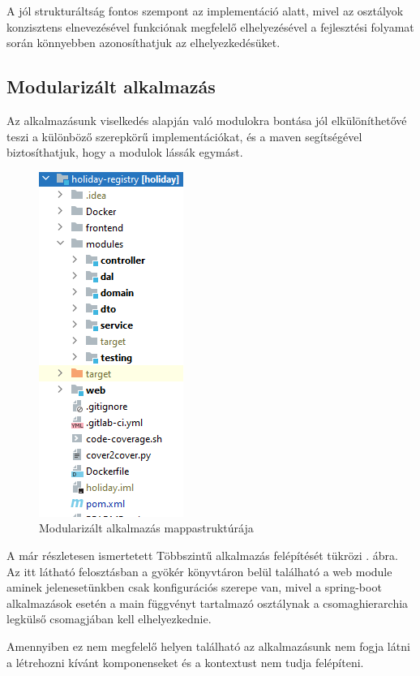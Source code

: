 
A jól strukturáltság fontos szempont az implementáció alatt, mivel az osztályok konzisztens elnevezésével funkciónak megfelelő elhelyezésével a fejlesztési folyamat során könnyebben azonosíthatjuk az elhelyezkedésüket.

\subsection{Modularizált alkalmazás}
Az alkalmazásunk viselkedés alapján való modulokra bontása jól elkülöníthetővé teszi a különböző szerepkörű implementációkat, és a maven segítségével biztosíthatjuk, hogy a modulok lássák egymást.
 
\begin{figure}[h]
	\centering
	\includegraphics[scale=0.6]{images/mapstructure.png}
	\caption{Modularizált alkalmazás mappastruktúrája}
	\label{fig:mapstructure}
\end{figure}

A már részletesen ismertetett Többszintű alkalmazás felépítését tükrözi . ábra. 
Az itt látható felosztásban a gyökér könyvtáron belül található a web module aminek jelenesetünkben csak konfigurációs szerepe van, mivel a spring-boot alkalmazások esetén a main függvényt tartalmazó osztálynak a csomaghierarchia legkülső csomagjában kell elhelyezkednie.

Amennyiben ez nem megfelelő helyen található az alkalmazásunk nem fogja látni a létrehozni kívánt komponenseket és a kontextust nem tudja felépíteni.


